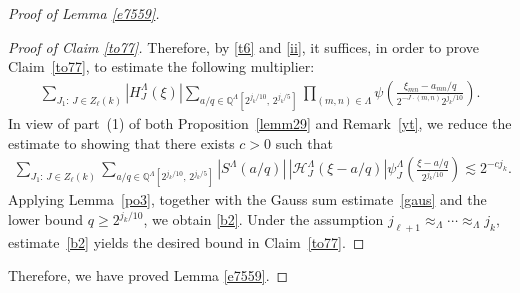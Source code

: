 \documentclass[11 pt,letterpaper]{amsart}
\theoremstyle{plain}
\theoremstyle{definition}
\theoremstyle{remark} \theoremstyle{exam} \theoremstyle{ob}
\numberwithin{equation}{section}
\begin{document}
\begin{proof}[Proof of Lemma \ref{e7559}]
\begin{proof}[Proof of Claim \ref{to77}]
Therefore, by \eqref{t6} and \eqref{ii}, it suffices, in order to prove Claim~\ref{to77}, to estimate the following multiplier:
\begin{align*} 
	\sum_{J_1:\,J\in Z_\ell(k)} |H^{\Lambda}_J(\xi)| \sum_{a/q \in \mathbb{Q}^{\Lambda}[2^{j_k/10},\,2^{j_k/5}]} \prod_{(m,n)\in\Lambda} \psi\!\left( \frac{\xi_{mn}-a_{mn}/q}{2^{-J\cdot (m,n)}2^{j_k/10}} \right). 
\end{align*}
 In view of part~(1) of both Proposition~\ref{lemm29} and Remark~\ref{yt}, we  reduce the estimate to showing that there exists $c>0$ such that
\begin{align}\label{b2}
\sum_{J_1:\,J\in Z_\ell(k)}
\sum_{a/q \in \mathbb{Q}^{\Lambda}[2^{j_k/10},\,2^{j_k/5}]}
|S^{\Lambda}(a/q)|\,
|\mathcal{H}^{\Lambda}_J(\xi-a/q)|
\psi_J^{\Lambda}\!\left(
\frac{\xi-a/q}{2^{j_k/10}}
\right)
\lesssim 2^{-c j_k}.
\end{align}
Applying Lemma~\ref{po3}, together with the Gauss sum estimate~\eqref{gaus} and the lower bound $q\ge 2^{j_k/10}$, we  obtain \eqref{b2}. Under the assumption
$j_{\ell+1}\approx_{\Lambda}\cdots\approx_{\Lambda} j_k,$
estimate~\eqref{b2} yields the desired bound in Claim~\ref{to77}.

\end{proof}
 Therefore, we have proved Lemma \ref{e7559}.
\end{proof}

 
 
\end{document}
